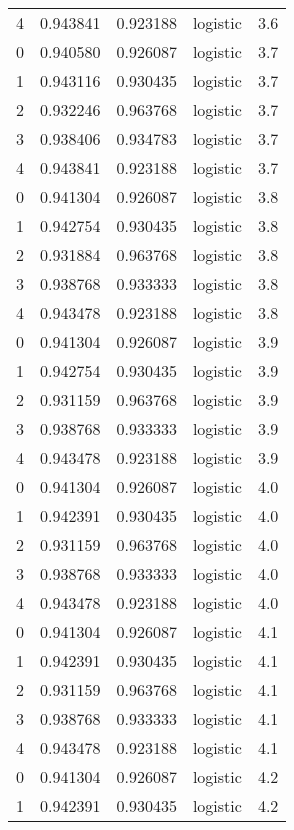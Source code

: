 \begin{tabular}{rrrlr}
     4 & 0.943841 & 0.923188 & logistic &        3.6 \\
     0 & 0.940580 & 0.926087 & logistic &        3.7 \\
     1 & 0.943116 & 0.930435 & logistic &        3.7 \\
     2 & 0.932246 & 0.963768 & logistic &        3.7 \\
     3 & 0.938406 & 0.934783 & logistic &        3.7 \\
     4 & 0.943841 & 0.923188 & logistic &        3.7 \\
     0 & 0.941304 & 0.926087 & logistic &        3.8 \\
     1 & 0.942754 & 0.930435 & logistic &        3.8 \\
     2 & 0.931884 & 0.963768 & logistic &        3.8 \\
     3 & 0.938768 & 0.933333 & logistic &        3.8 \\
     4 & 0.943478 & 0.923188 & logistic &        3.8 \\
     0 & 0.941304 & 0.926087 & logistic &        3.9 \\
     1 & 0.942754 & 0.930435 & logistic &        3.9 \\
     2 & 0.931159 & 0.963768 & logistic &        3.9 \\
     3 & 0.938768 & 0.933333 & logistic &        3.9 \\
     4 & 0.943478 & 0.923188 & logistic &        3.9 \\
     0 & 0.941304 & 0.926087 & logistic &        4.0 \\
     1 & 0.942391 & 0.930435 & logistic &        4.0 \\
     2 & 0.931159 & 0.963768 & logistic &        4.0 \\
     3 & 0.938768 & 0.933333 & logistic &        4.0 \\
     4 & 0.943478 & 0.923188 & logistic &        4.0 \\
     0 & 0.941304 & 0.926087 & logistic &        4.1 \\
     1 & 0.942391 & 0.930435 & logistic &        4.1 \\
     2 & 0.931159 & 0.963768 & logistic &        4.1 \\
     3 & 0.938768 & 0.933333 & logistic &        4.1 \\
     4 & 0.943478 & 0.923188 & logistic &        4.1 \\
     0 & 0.941304 & 0.926087 & logistic &        4.2 \\
     1 & 0.942391 & 0.930435 & logistic &        4.2 \\

\end{tabular}
